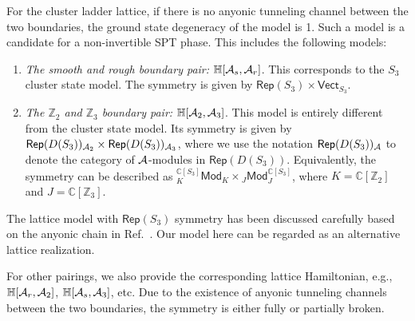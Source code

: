 \documentclass[a4paper,11pt]{article}
\theoremstyle{theorem}
\theoremstyle{remark}
\newcommand{\Zbb}{\mathbb{Z}}
\newcommand{\Cbb}{\mathbb{C}}
\newcommand{\Hbb}{\mathbb{H}}
\newcommand{\Rep}{\mathsf{Rep}}
\newcommand{\Mod}{\mathsf{Mod}}
\newcommand{\Vect}{\mathsf{Vect}}
\newcommand{\cA}{\text{\usefont{OMS}{cmsy}{m}{n}A}}
\begin{document}
For the cluster ladder lattice, if there is no anyonic tunneling channel between the two boundaries, the ground state degeneracy of the model is 1. Such a model is a candidate for a non-invertible SPT phase. This includes the following models:
\begin{enumerate}
    \item \emph{The smooth and rough boundary pair:} $\Hbb[\cA_s,\cA_r]$. This corresponds to the $S_3$ cluster state model. The symmetry is given by $\Rep(S_3) \times \Vect_{S_3}$.
    
    \item \emph{The $\Zbb_2$ and $\Zbb_3$ boundary pair:} $\Hbb[\cA_2,\cA_3]$. This model is entirely different from the cluster state model. Its symmetry is given by $\Rep(D(S_3))_{\cA_2} \times \Rep(D(S_3))_{\cA_3}$, where we use the notation $\Rep(D(S_3))_{\cA}$ to denote the category of $\cA$-modules in $\Rep(D(S_3))$. Equivalently, the symmetry can be described as ${^{\Cbb[S_3]}_K}\Mod_K \times {_J}\Mod^{\Cbb[S_3]}_J$, where $K = \Cbb[\Zbb_2]$ and $J = \Cbb[\Zbb_3]$.
\end{enumerate}
The lattice model with $\Rep(S_3)$ symmetry has been discussed carefully based on the anyonic chain in Ref.~\cite{bhardwaj2024lattice}. Our model here can be regarded as an alternative lattice realization.


For other pairings, we also provide the corresponding lattice Hamiltonian, e.g., $\Hbb[\cA_r,\cA_2]$, $\Hbb[\cA_s,\cA_3]$, etc. Due to the existence of anyonic tunneling channels between the two boundaries, the symmetry is either fully or partially broken.


\end{document}
